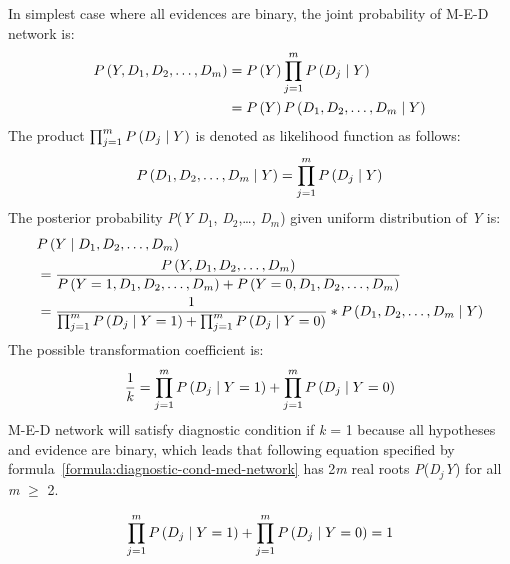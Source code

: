 \documentclass{article}
\numberwithin{equation}{section}
\numberwithin{figure}{section}
\numberwithin{table}{section}
\begin{document}
In simplest case where all evidences are binary, the joint probability of M-E-D network is:
\begin{align*}
P\left(Y,D_1,D_2,\dots ,D_m\right)&=P\left(Y\right)\prod^m_{j=1}{P\left(D_j\mathrel{\left|\vphantom{D_j Y}\right.\kern-\nulldelimiterspace}Y\right)}\\
&=P\left(Y\right)P\left(D_1,D_2,\dots ,D_m\mathrel{\left|\vphantom{D_1,D_2,\dots ,D_m Y}\right.\kern-\nulldelimiterspace}Y\right)
\end{align*}
The product $\prod^m_{j=1}{P\left(D_j\mathrel{\left|\vphantom{D_j Y}\right.\kern-\nulldelimiterspace}Y\right)}$ is denoted as likelihood function as follows:
\[P\left(D_1,D_2,\dots ,D_m\mathrel{\left|\vphantom{D_1,D_2,\dots ,D_m Y}\right.\kern-\nulldelimiterspace}Y\right)=\prod^m_{j=1}{P\left(D_j\mathrel{\left|\vphantom{D_j Y}\right.\kern-\nulldelimiterspace}Y\right)}\] 
The posterior probability \textit{P}(\textit{Y} {\textbar} \textit{D}${}_{1}$, \textit{D}${}_{2}$,{\dots}, \textit{D${}_{m}$}) given uniform distribution of \textit{Y} is:
\begin{align*}
&P\left(Y\mathrel{\left|\vphantom{Y D_1,D_2,\dots ,D_m}\right.\kern-\nulldelimiterspace}D_1,D_2,\dots ,D_m\right)\\
&=\frac{P\left(Y,D_1,D_2,\dots ,D_m\right)}{P\left(Y=1,D_1,D_2,\dots ,D_m\right)+P\left(Y=0,D_1,D_2,\dots ,D_m\right)}\\
&=\frac{1}{\prod^m_{j=1}{P\left(D_j\mathrel{\left|\vphantom{D_j Y=1}\right.\kern-\nulldelimiterspace}Y=1\right)}+\prod^m_{j=1}{P\left(D_j\mathrel{\left|\vphantom{D_j Y=0}\right.\kern-\nulldelimiterspace}Y=0\right)}}*P\left(D_1,D_2,\dots ,D_m\mathrel{\left|\vphantom{D_1,D_2,\dots ,D_m Y}\right.\kern-\nulldelimiterspace}Y\right)
\end{align*}
The possible transformation coefficient is:
\[\frac{1}{k}=\prod^m_{j=1}{P\left(D_j\mathrel{\left|\vphantom{D_j Y=1}\right.\kern-\nulldelimiterspace}Y=1\right)}+\prod^m_{j=1}{P\left(D_j\mathrel{\left|\vphantom{D_j Y=0}\right.\kern-\nulldelimiterspace}Y=0\right)}\] 
M-E-D network will satisfy diagnostic condition if \textit{k} = 1 because all hypotheses and evidence are binary, which leads that following equation specified by formula~\ref{formula:diagnostic-cond-med-network} has 2\textit{m} real roots \textit{P}(\textit{D${}_{j}${\textbar}Y}) for all \textit{m} $\mathrm{\ge}$ 2.

\begin{equation}
\prod^m_{j=1}{P\left(D_j\mathrel{\left|\vphantom{D_j Y=1}\right.\kern-\nulldelimiterspace}Y=1\right)}+\prod^m_{j=1}{P\left(D_j\mathrel{\left|\vphantom{D_j Y=0}\right.\kern-\nulldelimiterspace}Y=0\right)}=1
\label{formula:diagnostic-cond-med-network}
\end{equation}
\end{document}
